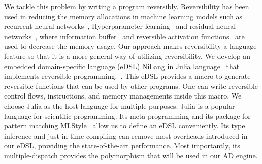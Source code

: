 \documentclass{article}
\newcommand{\<}{\langle}
\renewcommand{\>}{\rangle}
\theoremstyle{definition}\newtheorem{definition}{\textit{Definition}}
\begin{document}
    We tackle this problem by writing a program reversibly. Reversibility has been used in reducing the memory allocations in machine learning models such as recurrent neural networks~\cite{MacKay2018}, Hyperparameter learning~\cite{Maclaurin2015} and residual neural networks~\cite{Behrmann2018}, where information buffer~\cite{Maclaurin2015} and reversible activation functions~\cite{Gomez2017,Jacobsen2018} are used to decrease the memory usage.
    Our approach makes reversibility a language feature so that it is a more general way of utilizing reversibility.
    We develop an embedded domain-specific language (eDSL) NiLang in Julia language~\cite{Bezanson2012,Bezanson2017} that implements reversible programming.~\cite{Perumalla2013,Frank2017}. This eDSL provides a macro to generate reversible functions that can be used by other programs. One can write reversible control flows, instructions, and memory managements inside this macro.
We choose Julia as the host language for multiple purposes. Julia is a popular language for scientific programming. Its meta-programming and its package for pattern matching MLStyle~\cite{MLStyle} allow us to define an eDSL conveniently. Its type inference and just in time compiling can remove most overheads introduced in our eDSL, providing the state-of-the-art performance. Most importantly, its multiple-dispatch provides the polymorphism that will be used in our AD engine.
\end{document}
